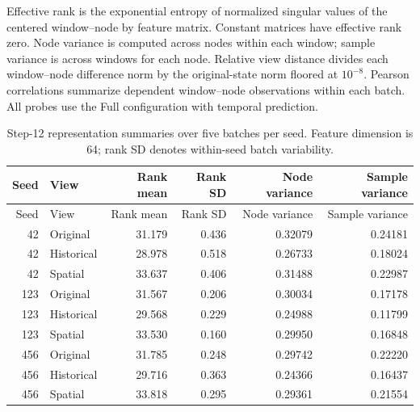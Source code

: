 \documentclass[a4paper,10pt]{article}
\begin{document}
Effective rank is the exponential entropy of normalized singular values of the centered window--node by feature matrix. Constant matrices have effective rank zero. Node variance is computed across nodes within each window; sample variance is across windows for each node. Relative view distance divides each window--node difference norm by the original-state norm floored at $10^{-8}$. Pearson correlations summarize dependent window--node observations within each batch. All probes use the Full configuration with temporal prediction.

\begingroup\footnotesize\setlength{\tabcolsep}{4pt}
\begin{longtable}{rlrrrr}
\caption{Step-12 representation summaries over five batches per seed. Feature dimension is 64; rank SD denotes within-seed batch variability.}\\
\toprule
Seed & View & Rank mean & Rank SD & Node variance & Sample variance \\
\midrule\endfirsthead
\toprule
Seed & View & Rank mean & Rank SD & Node variance & Sample variance \\
\midrule\endhead

42 & Original & 31.179 & 0.436 & 0.32079 & 0.24181 \\

42 & Historical & 28.978 & 0.518 & 0.26733 & 0.18024 \\

42 & Spatial & 33.637 & 0.406 & 0.31488 & 0.22987 \\

123 & Original & 31.567 & 0.206 & 0.30034 & 0.17178 \\

123 & Historical & 29.568 & 0.229 & 0.24988 & 0.11799 \\

123 & Spatial & 33.530 & 0.160 & 0.29950 & 0.16848 \\

456 & Original & 31.785 & 0.248 & 0.29742 & 0.22220 \\

456 & Historical & 29.716 & 0.363 & 0.24366 & 0.16437 \\

456 & Spatial & 33.818 & 0.295 & 0.29361 & 0.21554 \\

\bottomrule
\end{longtable}\endgroup
\end{document}
